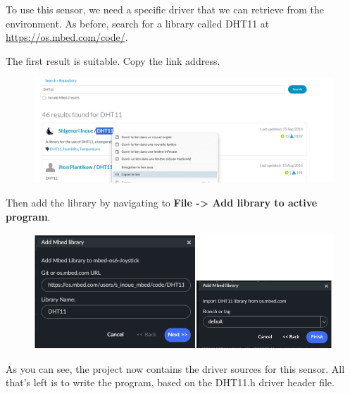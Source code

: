 \documentclass[10pt,a4paper,onecolumn]{article}
\begin{document}
To use this sensor, we need a specific driver that we can retrieve from the environment. As before, search for a library called DHT11 at \url{https://os.mbed.com/code/}.

The first result is suitable. Copy the link address.

\begin{figure}[H]
  \begin{center}
    \includegraphics[width=\dimexpr\textwidth-1cm\relax,height=\dimexpr0.25\textheight-1cm\relax,keepaspectratio]{images/17.png}
  \end{center}
\end{figure}

Then add the library by navigating to \textbf{File -> Add library to active program}.

\begin{figure}[H]
  \begin{center}
    \includegraphics[width=\dimexpr\textwidth-1cm\relax,height=\dimexpr0.25\textheight-3cm\relax,keepaspectratio]{images/18.png}
  \end{center}
\end{figure}

As you can see, the project now contains the driver sources for this sensor. All that's left is to write the program, based on the DHT11.h driver header file.
\end{document}
